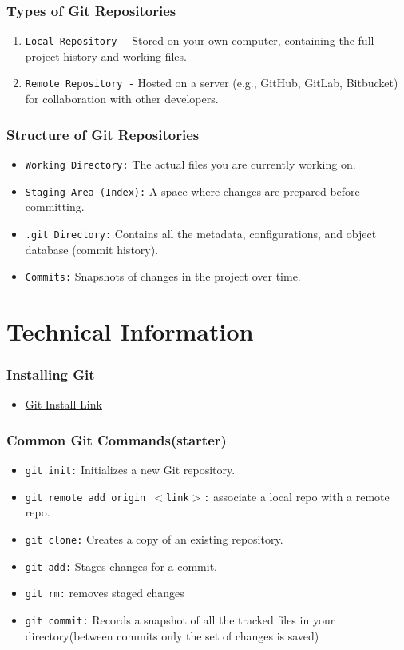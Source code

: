 \documentclass{beamer}
\begin{document}
\begin{frame}\frametitle{Types of Git Repositories}
\begin{enumerate}
\item \texttt{Local Repository -} Stored on your own computer, containing the full project history and working files.
\item \texttt{Remote Repository -} Hosted on a server (e.g., GitHub, GitLab, Bitbucket) for collaboration with other developers.
\end{enumerate}
\end{frame}


\begin{frame}\frametitle{Structure of Git Repositories}
\begin{itemize}
\item \texttt{Working Directory:} The actual files you are currently working on.
\item \texttt{Staging Area (Index):} A space where changes are prepared before committing.
\item \texttt{.git Directory:} Contains all the metadata, configurations, and object database (commit history).
\item \texttt{Commits:} Snapshots of changes in the project over time.
\end{itemize}
\end{frame}


\section{Technical Information}
\begin{frame}\frametitle{Installing Git}
    \begin{itemize}
    \item \href{https://git-scm.com/downloads}{Git Install Link}
    \end{itemize}
    \end{frame}


\begin{frame}\frametitle{Common Git Commands(starter)}
\begin{itemize}
\item \texttt{git init:} Initializes a new Git repository.
\item \texttt{git remote add origin $<$link$>$:} associate a local repo with a remote repo. 
\item \texttt{git clone:} Creates a copy of an existing repository.
\item \texttt{git add:} Stages changes for a commit.
\item \texttt{git rm:} removes staged changes
\item \texttt{git commit:} Records a snapshot of all the tracked files in your directory(between commits only the set of changes is saved)
\end{itemize}
\end{frame}
\end{document}
